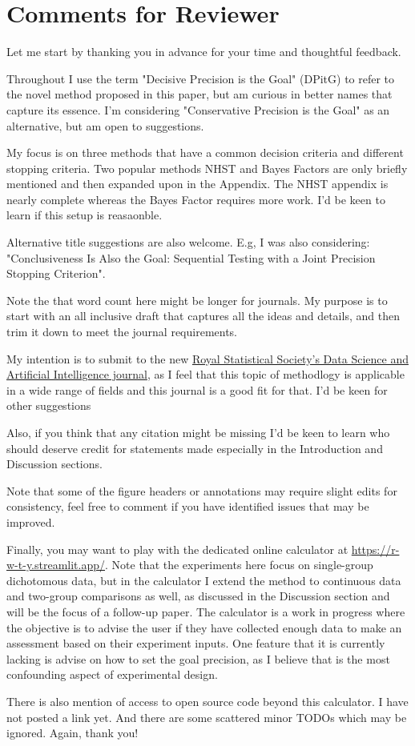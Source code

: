 \section*{Comments for Reviewer}

Let me start by thanking you in advance for your time and thoughtful feedback.

Throughout I use the term "Decisive Precision is the Goal" (DPitG) to refer to the novel method
proposed in this paper, but am curious in better names that capture its essence. I'm 
considering "Conservative Precision is the Goal" as an alternative, but am open to suggestions.

My focus is on three methods that have a common decision criteria and different stopping criteria.
Two popular methods NHST and Bayes Factors are only briefly mentioned and then expanded upon
in the Appendix. The NHST appendix is nearly complete whereas the Bayes Factor requires more work.
I'd be keen to learn if this setup is reasaonble.

Alternative title suggestions are also welcome. E.g, I was also considering:
"Conclusiveness Is Also the Goal: Sequential Testing with a Joint Precision Stopping Criterion".

Note the that word count here might be longer for journals.
My purpose is to start with an all inclusive draft that captures all the ideas and
details, and then trim it down to meet the journal requirements.

My intention is to submit to the new \href{https://academic.oup.com/rssdat}{Royal Statistical Society's Data Science and Artificial Intelligence journal},
as I feel that this topic of methodlogy is applicable in a wide range of fields and this
journal is a good fit for that. I'd be keen for other suggestions
 
Also, if you think that any citation might be missing I'd be keen to learn who should deserve
credit for statements made especially in the Introduction and Discussion sections.

Note that some of the figure headers or annotations may require slight edits for consistency,
feel free to comment if you have identified issues that may be improved.

Finally, you may want to play with the dedicated online calculator at \href{https://r-w-t-y.streamlit.app/}{https://r-w-t-y.streamlit.app/}.
Note that the experiments here focus on single-group dichotomous data,
but in the calculator I extend the method to continuous data and two-group comparisons as well,
as discussed in the Discussion section and will be the focus of a follow-up paper.
The calculator is a work in progress where the objective is to advise the user
if they have collected enough data to make an assessment based on their experiment inputs.
One feature that it is currently lacking is advise on how to set the goal precision, as I believe
that is the most confounding aspect of experimental design.

There is also mention of access to open source code beyond this calculator. I have not posted
a link yet. And there are some scattered minor TODOs which may be ignored. Again, thank you!

